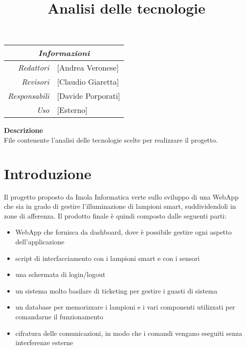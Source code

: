 \documentclass[12pt]{article}
\begin{document}
\graphicspath{ {../templates/img/} }
\setcounter{tocdepth}{4}
\setcounter{secnumdepth}{4}
\title{Analisi delle tecnologie}

\firstPage

\pagestyle{genericDocstyle}
\maketitle

\begin{center}
    \begin{tabular}{r | l}
		\multicolumn{2}{c}{\textit{Informazioni}}\\
		\hline
		
			\textit{Redattori} &
			[Andrea Veronese]\makecell{}\\

			\textit{Revisori} &
			[Claudio Giaretta]\makecell{}\\
			\textit{Responsabili} &
			[Davide Porporati]\makecell{}\\
		      \textit{Uso} & 
                [Esterno]\makecell{}\\
    \end{tabular}
\end{center}

\begin{center}
    \textbf{Descrizione}\\
	File contenente l'analisi delle tecnologie scelte per realizzare il progetto. 
\end{center}

\pagebreak

\tableofcontents
\pagebreak

\printindex 


\makeversioni

\section{Introduzione}
Il progetto proposto da Imola Informatica verte sullo sviluppo di una WebApp che sia in grado di gestire l'illuminazione di lampioni smart, suddividendoli in zone di afferenza.
Il prodotto finale è quindi composto dalle seguenti parti:
\begin{itemize}
	\item WebApp che fornisca da dashboard, dove è possibile gestire ogni aspetto dell'applicazione
	\item script di interfacciamento con i lampioni smart e con i sensori
	\item una schermata di login/logout
	\item un sistema molto basilare di ticketing per gestire i guasti di sistema
	\item un database per memorizzare i lampioni e i vari componenti utilizzati per comandarne il funzionamento
	\item cifratura delle comunicazioni, in modo che i comandi vengano eseguiti senza interferenze esterne
\end{itemize}
\end{document}
